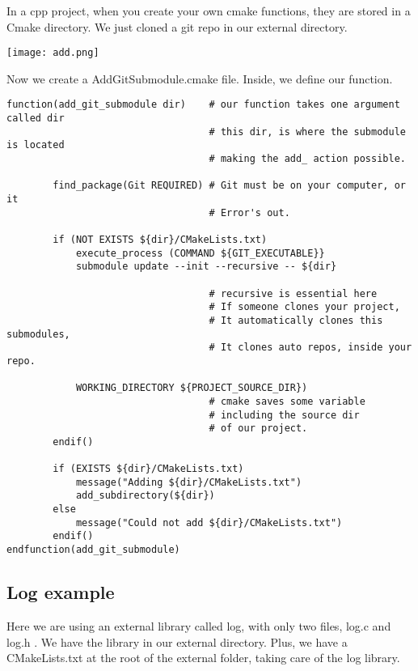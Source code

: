 \documentclass[openany]{report}
\begin{document}
In a cpp project, when you create your own cmake functions, they are stored in a Cmake directory. We just cloned a 
git repo in our external directory.

\begin{center}
    \texttt{[image: add.png]}
\end{center}

Now we create a AddGitSubmodule.cmake file. Inside, we define our function.

\begin{verbatim}
function(add_git_submodule dir)    # our function takes one argument called dir
                                   # this dir, is where the submodule is located
                                   # making the add_ action possible.

        find_package(Git REQUIRED) # Git must be on your computer, or it
                                   # Error's out.

        if (NOT EXISTS ${dir}/CMakeLists.txt)
            execute_process (COMMAND ${GIT_EXECUTABLE}}
            submodule update --init --recursive -- ${dir}

                                   # recursive is essential here
                                   # If someone clones your project, 
                                   # It automatically clones this submodules,
                                   # It clones auto repos, inside your repo.
                                                            
            WORKING_DIRECTORY ${PROJECT_SOURCE_DIR}) 
                                   # cmake saves some variable
                                   # including the source dir
                                   # of our project.
        endif()
        
        if (EXISTS ${dir}/CMakeLists.txt)
            message("Adding ${dir}/CMakeLists.txt")
            add_subdirectory(${dir})
        else
            message("Could not add ${dir}/CMakeLists.txt")
        endif()
endfunction(add_git_submodule)
\end{verbatim}

\subsection{Log example}

Here we are using an external library called log, with only two files, log.c and log.h . We have the library in our 
external directory. Plus, we have a CMakeLists.txt at the root of the external folder, taking care of the log library. 
\end{document}
